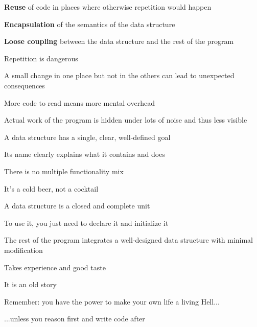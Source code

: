 \documentclass{beamer}
\begin{document}
\begin{slide}{
\item \textbf{Reuse} of code in places where otherwise repetition would happen
\item \textbf{Encapsulation} of the semantics of the data structure
\item \textbf{Loose coupling} between the data structure and the rest of the program
}\end{slide}

\begin{slide}{
\item Repetition is dangerous
\item A small change in one place but not in the others can lead to unexpected consequences
\item More code to read means more mental overhead
\item Actual work of the program is hidden under lots of noise and thus less visible
}\end{slide}

\begin{slide}{
\item A data structure has a single, clear, well-defined goal
\item Its name clearly explains what it contains and does
\item There is no multiple functionality mix
\pause
\item It's a cold beer, not a cocktail
}\end{slide}

\begin{slide}{
\item A data structure is a closed and complete unit
\item To use it, you just need to declare it and initialize it
\item The rest of the program integrates a well-designed data structure with minimal modification
}\end{slide}

\begin{slide}{
\item Takes experience and good taste
\item It is an old story
\item Remember: you have the power to make your own life a living Hell...
\pause
\item ...unless you reason first and write code after
}\end{slide}
\end{document}
